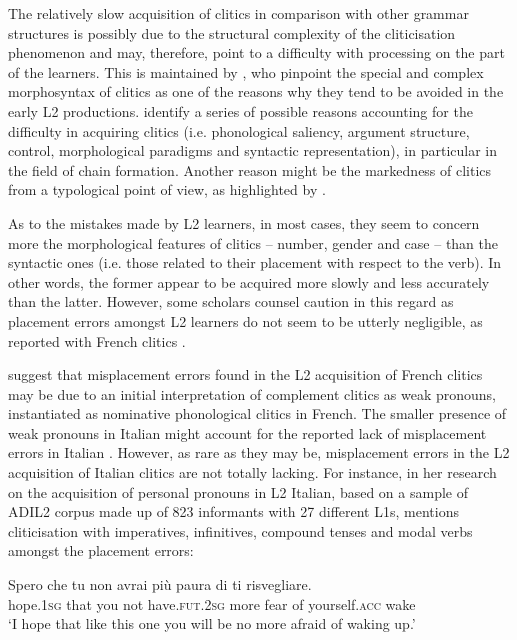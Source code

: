 \documentclass[output=paper,modfonts,nonflat,newtxmath]{langsci/langscibook}
\begin{document}
The relatively slow acquisition of clitics in comparison with other grammar structures is possibly due to the structural complexity of the cliticisation phenomenon and may, therefore, point to a difficulty with processing on the part of the learners. This is maintained by \citet{BellettiGuasti2015}, who pinpoint the special and complex morphosyntax of clitics as one of the reasons why they tend to be avoided in the early L2 productions. \citet{BottariEtAl2000} identify a series of possible reasons accounting for the difficulty in acquiring clitics (i.e. phonological saliency, argument structure, control, morphological paradigms and syntactic representation), in particular in the field of chain formation. Another reason might be the markedness of clitics from a typological point of view, as highlighted by \citet[329]{Berretta1986}.

As to the mistakes made by L2 learners, in most cases, they seem to concern more the morphological features of clitics – number, gender and case – than the syntactic ones (i.e. those related to their placement with respect to the verb). In other words, the former appear to be acquired more slowly and less accurately than the latter. However, some scholars counsel caution in this regard as placement errors amongst L2 learners do not seem to be utterly negligible, as reported with French clitics \citep{White1996, HulkMuller2000, BellettiHamann2004, GranfeldtSchlyter2004, HamannBelletti2006}.

\citet{HamannBelletti2006} suggest that misplacement errors found in the L2 acquisition of French clitics may be due to an initial interpretation of complement clitics as weak pronouns, instantiated as nominative phonological clitics in French. The smaller presence of weak pronouns in Italian might account for the reported lack of misplacement errors in Italian \citep{BellettiGuasti2015}. However, as rare as they may be, misplacement errors in the L2 acquisition of Italian clitics are not totally lacking. For instance, in her research on the acquisition of personal pronouns in L2 Italian, based on a sample of ADIL2 corpus made up of 823 informants with 27 different L1s, \citet[116]{Maffei2009} mentions cliticisation with imperatives, infinitives, compound tenses and modal verbs amongst the placement errors:

\ea  \label{ex:sciutti:28}
    \gll Spero che tu non avrai più paura di ti risvegliare.\\
         hope.\textsc{1sg} that you not have.\textsc{fut.2sg} more fear of yourself.\textsc{acc} wake\\
    \glt  ‘I hope that like this one you will be no more afraid of waking up.’
\z
\end{document}
